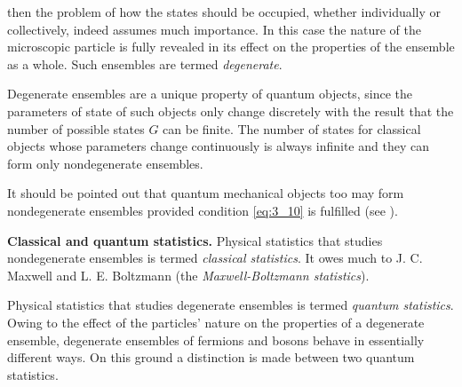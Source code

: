 \noindent
then the problem of how the states should be occupied, whether individually or collectively, indeed assumes much importance. In this case the nature of the microscopic particle is fully revealed in its effect on the properties of the ensemble as a whole. Such ensembles
are termed \textit{degenerate}.

Degenerate ensembles are a unique property of quantum objects, since the parameters of state of such objects only change discretely with the result that the number of possible states $G$ can be finite. The number of states for classical objects whose parameters change continuously is always infinite and they can form only nondegenerate ensembles.

It should be pointed out that quantum mechanical objects too may form nondegenerate ensembles provided condition \eqref{eq:3_10} is fulfilled (see ).

\begin{table}[!b]
	\renewcommand{\arraystretch}{1.2}
	\caption{}
	\vspace{-0.6cm}
	\label{table:3_1}
	\begin{center}\end{center}
\end{table}

\textbf{Classical and quantum statistics.} Physical statistics that studies nondegenerate ensembles is termed \textit{classical statistics}. It owes much to J. C. Maxwell and L. E. Boltzmann (the \textit{Maxwell-Boltzmann statistics}).

Physical statistics that studies degenerate ensembles is termed \textit{quantum statistics}. Owing to the effect of the particles' nature on the properties of a degenerate ensemble, degenerate ensembles of fermions and bosons behave in essentially different ways. On this ground a distinction is made between two quantum statistics.

